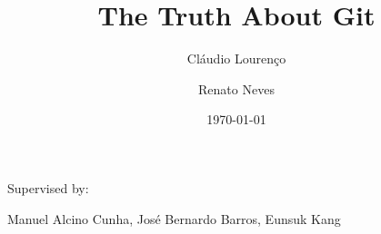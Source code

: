 \documentclass[a4paper,11pt]{article}
\title{The Truth About Git}
\author{Cláudio Lourenço \and Renato Neves}
\begin{document}
\date{\today}
\maketitle
Supervised by:\par
Manuel Alcino Cunha, José Bernardo Barros, Eunsuk Kang

\newpage
\tableofcontents
\newpage












\appendix 
\appendixpage
\addappheadtotoc

\end{document}
